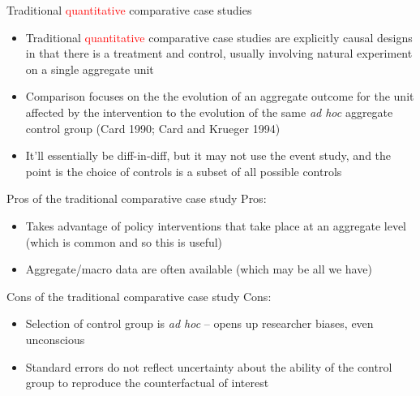 \documentclass{beamer}
\begin{document}
\begin{frame}{Traditional \textcolor{red}{quantitative} comparative case studies}

\begin{itemize}
	\item Traditional  \textcolor{red}{quantitative}  comparative case studies are explicitly causal designs in that there is a treatment and control, usually involving natural experiment on a single aggregate unit
	\item Comparison focuses on the the evolution of an aggregate outcome for the unit affected by the intervention to the evolution of the same \emph{ad hoc} aggregate control group (Card 1990; Card and Krueger 1994)
	\item It'll essentially be diff-in-diff, but it may not use the event study, and the point is the choice of controls is a subset of all possible controls
\end{itemize}

\end{frame}

\begin{frame}{Pros of the traditional comparative case study}
	Pros:

		\begin{itemize}
		\item Takes advantage of policy interventions that take place at an aggregate level (which is common and so this is useful)
		\item Aggregate/macro data are often available (which may be all we have)
		\end{itemize}
\end{frame}

\begin{frame}{Cons of the traditional comparative case study}
	Cons:

		\begin{itemize}
		\item Selection of control group is \emph{ad hoc} -- opens up researcher biases, even unconscious
		\item Standard errors do not reflect uncertainty about the ability of the control group to reproduce the counterfactual of interest
		\end{itemize}
\end{frame}
\end{document}
